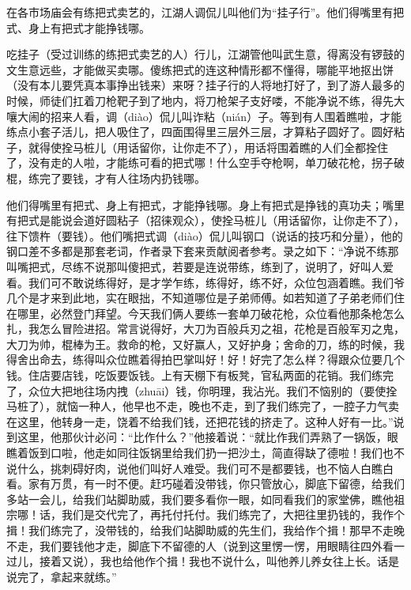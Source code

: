 \documentclass[12pt,UTF8]{ctexbook}
\begin{document}
在各市场庙会有练把式卖艺的，江湖人调侃儿叫他们为“挂子行”。他们得嘴里有把式、身上有把式才能挣钱哪。



吃挂子（受过训练的练把式卖艺的人）行儿，江湖管他叫武生意，得离没有锣鼓的文生意远些，才能做买卖哪。傻练把式的连这种情形都不懂得，哪能平地抠出饼（没有本儿要凭真本事挣出钱来）来呀？挂子行的人将地打好了，到了游人最多的时候，师徒们扛着刀枪靶子到了地内，将刀枪架子支好喽，不能净说不练，得先大嚷大闹的招来人看，调（diào）侃儿叫诈粘（nián）子。等到有人围着瞧啦，才能练点小套子活儿，把人吸住了，四面围得里三层外三层，才算粘子圆好了。圆好粘子，就得使拴马桩儿（用话留你，让你走不了），用话将围着瞧的人们全都拴住了，没有走的人啦，才能练可看的把式哪！什么空手夺枪啊，单刀破花枪，拐子破棍，练完了要钱，才有人往场内扔钱哪。

他们得嘴里有把式、身上有把式，才能挣钱哪。身上有把式是挣钱的真功夫；嘴里有把式是能说会道好圆粘子（招徕观众），使拴马桩儿（用话留你，让你走不了），往下馈杵（要钱）。他们嘴把式调（diào）侃儿叫钢口（说话的技巧和分量），他的钢口差不多都是那套老词，作者录下套来贡献阅者参考。录之如下：“净说不练那叫嘴把式，尽练不说那叫傻把式，若要是连说带练，练到了，说明了，好叫人爱看。我们可不敢说练得好，是才学乍练，练得好，练不好，众位包涵着瞧。我们爷几个是才来到此地，实在眼拙，不知道哪位是子弟师傅。如若知道了子弟老师们住在哪里，必然登门拜望。今天我们俩人要练一套单刀破花枪，众位看他那条枪怎么扎，我怎么冒险进招。常言说得好，大刀为百般兵刃之祖，花枪是百般军刃之鬼，大刀为帅，棍棒为王。救命的枪，又好赢人，又好护身；舍命的刀，练的时候，我得舍出命去，练得叫众位瞧着得拍巴掌叫好！好！好完了怎么样？得跟众位要几个钱。住店要店钱，吃饭要饭钱。上有天棚下有板凳，官私两面的花销。我们练完了，众位大把地往场内拽（zhuāi）钱，你明理，我沾光。我们不恼别的（要使拴马桩了），就恼一种人，他早也不走，晚也不走，到了我们练完了，一腔子力气卖在这里，他转身一走，饶着不给我们钱，还把花钱的挤走了。这种人好有一比。”说到这里，他那伙计必问：“比作什么？”他接着说：“就比作我们弄熟了一锅饭，眼瞧着饭到口啦，他走如同往饭锅里给我们扔一把沙土，简直得缺了德啦！我们也不说什么，挑刺碍好肉，说他们叫好人难受。我们可不是都要钱，也不恼人白瞧白看。家有万贯，有一时不便。赶巧碰着没带钱，你只管放心，脚底下留德，给我们多站一会儿，给我们站脚助威，我们要多看你一眼，如同看我们的家堂佛，瞧他祖宗哪！话，我们是交代完了，再托付托付。我们练完了，大把往里扔钱的，我作个揖！我们练完了，没带钱的，给我们站脚助威的先生们，我给作个揖！那早不走晚不走，我们要钱他才走，脚底下不留德的人（说到这里愣一愣，用眼睛往四外看一过儿，接着又说），我也给他作个揖！我也不说什么，叫他养儿养女往上长。话是说完了，拿起来就练。”
\end{document}
